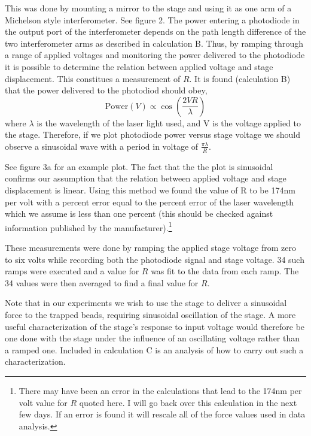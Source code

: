 \documentclass{report}
\begin{document}
This was done by mounting a mirror to the stage and using it as one arm of a Michelson style interferometer. See figure 2. The power entering a photodiode in the output port of the interferometer depends on the path length difference of the two interferometer arms as described in calculation B. Thus, by ramping through a range of applied voltages and monitoring the power delivered to the photodiode it is possible to determine the relation between applied voltage and stage displacement. This constitues a measurement of $R$. It is found (calculation B) that the power delivered to the photodiod should obey,
\begin{displaymath}
\textrm{Power}(V) \propto \cos(\frac{2VR}{\lambda})
\end{displaymath}
where $\lambda$ is the wavelength of the laser light used, and V is the voltage applied to the stage. Therefore, if we plot photodiode power versus stage voltage we should observe a sinusoidal wave with a period in voltage of $\frac{\pi \lambda}{R}$.

See figure 3a for an example plot. The fact that the the plot is sinusoidal confirms our assumption that the relation between applied voltage and stage displacement is linear. Using this method we found the value of R to be 174nm per volt with a percent error equal to the percent error of the laser wavelength which we assume is less than one percent (this should be checked against information published by the manufacturer).\footnote{There may have been an error in the calculations that lead to the 174nm per volt value for $R$ quoted here. I will go back over this calculation in the next few days. If an error is found it will rescale all of the force values used in data analysis.}

These measurements were done by ramping the applied stage voltage from zero to six volts while recording both the photodiode signal and stage voltage. 34 such ramps were executed and a value for $R$ was fit to the data from each ramp. The 34 values were then averaged to find a final value for $R$.

Note that in our experiments we wish to use the stage to deliver a sinusoidal force to the trapped beads, requiring sinusoidal oscillation of the stage. A more useful characterization of the stage's response to input voltage would therefore be one done with the stage under the influence of an oscillating voltage rather than a ramped one. Included in calculation C is an analysis of how to carry out such a characterization.
\end{document}

